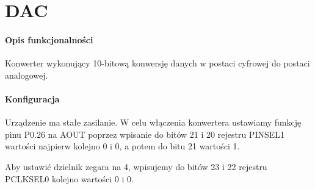 \documentclass{article}
\begin{document}
    \section{DAC}
        
	\paragraph{Opis funkcjonalności}

	    Konwerter wykonujący 10-bitową konwersję danych w postaci cyfrowej
	    do postaci analogowej.

	\paragraph{Konfiguracja}

	    Urządzenie ma stałe zasilanie. W celu włączenia konwertera ustawiamy
	    funkcję pinu P0.26 na AOUT poprzez wpisanie do bitów 21 i 20
	    rejestru PINSEL1 wartości najpierw kolejno 0 i 0, a potem do bitu
	    21 wartości 1.

	    Aby ustawić dzielnik zegara na 4, wpisujemy do bitów 23 i 22
	    rejestru PCLKSEL0 kolejno wartości 0 i 0.
\end{document}
